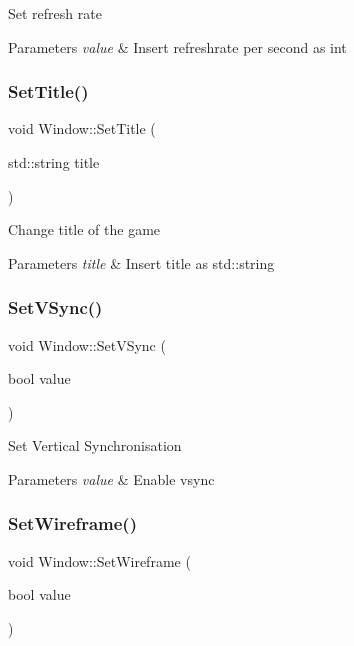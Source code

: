 Set refresh rate 
\begin{DoxyParams}{Parameters}
{\em value} & Insert refreshrate per second as int \\
\hline
\end{DoxyParams}
\mbox{\label{class_window_a4b2829cb820c5a7232e641c571faccb3}} 
\subsubsection{\texorpdfstring{SetTitle()}{SetTitle()}}
{\footnotesize\ttfamily void Window\+::\+Set\+Title (\begin{DoxyParamCaption}\item[{std\+::string}]{title }\end{DoxyParamCaption})}

Change title of the game 
\begin{DoxyParams}{Parameters}
{\em title} & Insert title as std\+::string \\
\hline
\end{DoxyParams}
\mbox{\label{class_window_afa6d844ee8fa9a35ac6fc5db24c72e1d}} 
\subsubsection{\texorpdfstring{SetVSync()}{SetVSync()}}
{\footnotesize\ttfamily void Window\+::\+Set\+V\+Sync (\begin{DoxyParamCaption}\item[{bool}]{value }\end{DoxyParamCaption})}

Set Vertical Synchronisation 
\begin{DoxyParams}{Parameters}
{\em value} & Enable vsync \\
\hline
\end{DoxyParams}
\mbox{\label{class_window_a3c24f203720fadb2b41fc26d205b5a26}} 
\subsubsection{\texorpdfstring{SetWireframe()}{SetWireframe()}}
{\footnotesize\ttfamily void Window\+::\+Set\+Wireframe (\begin{DoxyParamCaption}\item[{bool}]{value }\end{DoxyParamCaption})}

